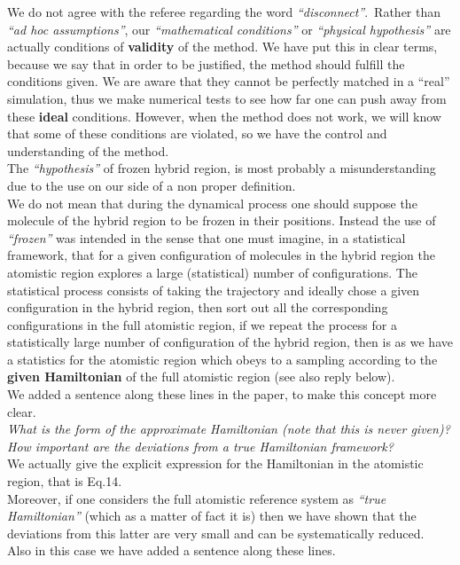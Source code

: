 \documentclass[12pt]{article}
\begin{document}
We do not agree with the referee regarding the word {\it ``disconnect''}.\
Rather than {\it ``ad hoc assumptions''}, our {\it ``mathematical conditions''} or {\it ``physical hypothesis''}
are actually conditions of {\bf validity} of the method. We have put this in clear terms, because we say that in order to be justified,
the method should fulfill the conditions given. We are aware that they cannot be perfectly matched in a ``real'' simulation, thus we make numerical tests to see how far one can push away from these {\bf ideal} conditions.
However, when the method does not work, we will know that some of these conditions are violated, so we have the control and understanding of the method.\\
The {\it ``hypothesis''} of frozen hybrid region, is most probably a misunderstanding due to the use on our side of a non proper definition.\\
We do not mean that during the dynamical process one should suppose the molecule of the hybrid region to be frozen in their positions. Instead the use of {\it ``frozen''} was intended in the sense that one must imagine, in a statistical framework, that for a given configuration of molecules in the hybrid region the atomistic region explores a large (statistical) number of configurations. The statistical process consists of taking the trajectory and ideally chose a given configuration in the hybrid region, then sort out all the corresponding configurations in the full atomistic region, if we repeat the process for a statistically large number of configuration of the hybrid region, then is as we have a statistics for the atomistic region which obeys to a sampling according to the {\bf given Hamiltonian} of the full atomistic region (see also reply below).\\
We added a sentence along these lines in the paper, to make this concept more clear.\\

{\color{red} {\it What is the form of the approximate Hamiltonian (note that
this is never given)? How important are the deviations from a true Hamiltonian framework?}}\\

We actually give the explicit expression for the Hamiltonian in the atomistic region,
that is Eq.14.\\
Moreover, if one considers the full atomistic reference system as {\it ``true Hamiltonian''} (which as a matter of fact it is) then we have shown that the deviations from this latter are very small and 
can be systematically reduced.\\
Also in this case we have added a sentence along these lines.\\
\end{document}
